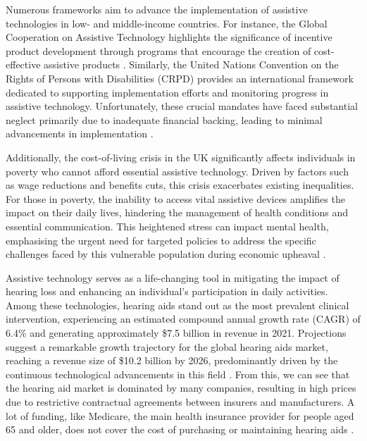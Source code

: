 \documentclass{l4proj}
\begin{document}
Numerous frameworks aim to advance the implementation of assistive technologies in low- and middle-income countries. For instance, the Global Cooperation on Assistive Technology highlights the significance of incentive product development through programs that encourage the creation of cost-effective assistive products \citep{Tangcharoensathien2018-le}. Similarly, the United Nations Convention on the Rights of Persons with Disabilities (CRPD) \citep{United_Nations} provides an international framework dedicated to supporting implementation efforts and monitoring progress in assistive technology. Unfortunately, these crucial mandates have faced substantial neglect primarily due to inadequate financial backing, leading to minimal advancements in implementation \citep{00006479-201135010-00003}.

Additionally, the cost-of-living crisis in the UK significantly affects individuals in poverty who cannot afford essential assistive technology. Driven by factors such as wage reductions and benefits cuts, this crisis exacerbates existing inequalities. For those in poverty, the inability to access vital assistive devices amplifies the impact on their daily lives, hindering the management of health conditions and essential communication. This heightened stress can impact mental health, emphasising the urgent need for targeted policies to address the specific challenges faced by this vulnerable population during economic upheaval \citep{broadbent2023public}.

Assistive technology serves as a life-changing tool in mitigating the impact of hearing loss and enhancing an individual's participation in daily activities. Among these technologies, hearing aids stand out as the most prevalent clinical intervention, experiencing an estimated compound annual growth rate (CAGR) of 6.4\% and generating approximately \$7.5 billion in revenue in 2021. Projections suggest a remarkable growth trajectory for the global hearing aids market, reaching a revenue size of \$10.2 billion by 2026, predominantly driven by the continuous technological advancements in this field \citep{Market_Research_Firm}. From this, we can see that the hearing aid market is dominated by many companies, resulting in high prices due to restrictive contractual agreements between insurers and manufacturers. A lot of funding, like Medicare, the main health insurance provider for people aged 65 and older, does not cover the cost of purchasing or maintaining hearing aids \cite{10.1001/jamaoto.2018.0273}.
\end{document}
